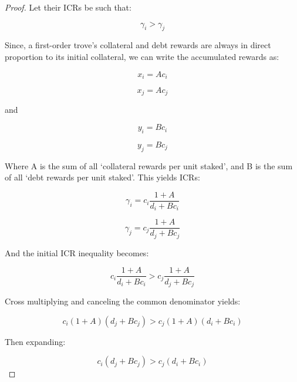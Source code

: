 \documentclass[reqno]{article}
\begin{document}
\begin{proof}
Let their ICRs be such that:

\begin{equation} 
    \gamma_i > \gamma_j
\end{equation}

\bigskip
Since, a first-order trove’s collateral and debt rewards are always in direct proportion to its initial collateral, we can write the accumulated rewards as:

\begin{equation} 
    x_i=Ac_i
\end{equation}

\begin{equation} 
    x_j=Ac_j
\end{equation}

and

\begin{equation} 
    y_i=Bc_i
\end{equation}

\begin{equation} 
    y_j=Bc_j
\end{equation}

\bigskip
Where A is the sum of all ‘collateral rewards per unit staked’, and B is the sum of all ‘debt rewards per unit staked’. This yields ICRs:

\begin{equation} 
    \gamma_i=c_i\frac{1+A}{d_i+Bc_i}
\end{equation}

\begin{equation} 
    \gamma_j=c_j\frac{1+A}{d_j+Bc_j}
\end{equation}

And the initial ICR inequality becomes:

\begin{equation} 
    c_i\frac{1+A}{d_i+Bc_i}>c_j\frac{1+A}{d_j+Bc_j}
\end{equation}

\bigskip
Cross multiplying and canceling the common denominator yields:

\begin{equation} 
    c_i\left(1+A\right)\left(d_j+Bc_j\right)>c_j\left(1+A\right)\left(d_i+Bc_i\right)
\end{equation}

Then expanding:

\begin{equation} 
    c_i\left(d_j+Bc_j\right)>c_j\left(d_i+Bc_i\right)
\end{equation}


\end{proof}
\end{document}
